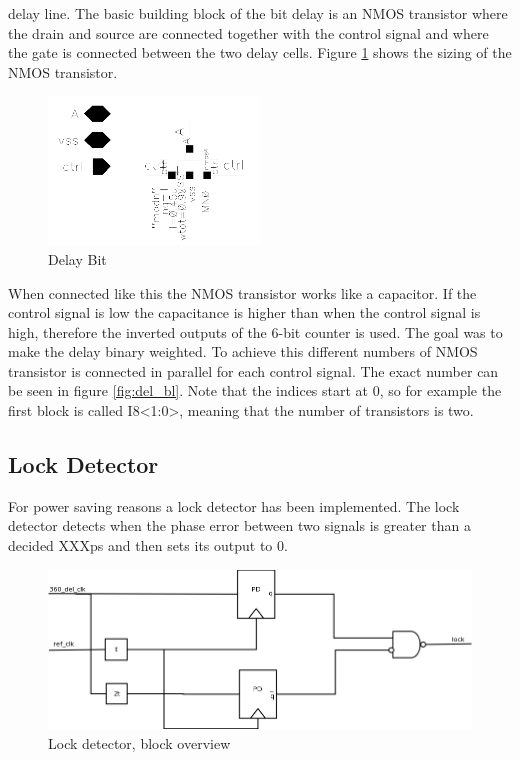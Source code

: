 \documentclass[a4paper,12pt]{article} \usepackage{graphicx}
\begin{document}
delay line. 
The basic building block of the
bit delay is an NMOS transistor where the drain and source are connected
together with the control signal and where the gate is connected between the two
delay cells. Figure \ref{fig:del_bit} shows the sizing of the NMOS transistor.
\begin{figure}[h]
        \centering
        \includegraphics[width=0.5\textwidth]{../Bilder/Delay_Line/Delay_bit.png}
        \caption{Delay Bit}
        \label{fig:del_bit}
\end{figure}
When connected like this the NMOS transistor works like a capacitor. If the control
signal is low the capacitance is higher than when the control signal is high,
therefore the inverted outputs of the 6-bit counter is used. The goal was to
make the delay binary weighted. To achieve this different numbers of NMOS
transistor is connected in parallel for each control signal. The exact number
can be seen in figure \ref{fig:del_bl}. Note that the indices start at 0, so for
example the first block is called I8<1:0>, meaning that the number of
transistors is two.

\subsection{Lock Detector}
For power saving reasons a lock detector has been implemented. The
lock detector detects when the phase error between two signals is
greater than a decided XXXps and then sets its output to 0.

\begin{figure}[h]
        \centering
        \includegraphics[width=150mm]{../Bilder/Lockdetector.png}
        \caption{Lock detector, block overview}
        \label{fig:LD_block}
\end{figure}
\end{document}
